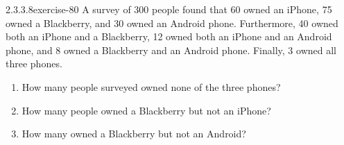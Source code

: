 \documentclass[twoside,10pt,]{book}
\numberwithin{equation}{section}
\begin{document}
\begin{divisionsolution}{2.3.3.8}{}{exercise-80}%
\hypertarget{p-757}{}%
A survey of 300 people found that 60 owned an iPhone, 75 owned a Blackberry, and 30 owned an Android phone. Furthermore, 40 owned both an iPhone and a Blackberry, 12 owned both an iPhone and an Android phone, and 8 owned a Blackberry and an Android phone. Finally, 3 owned all three phones.%
\par
\hypertarget{p-758}{}%
\leavevmode%
\begin{enumerate}[label=(\alph*)]
\item\hypertarget{li-454}{}\hypertarget{p-759}{}%
How many people surveyed owned none of the three phones?%
\item\hypertarget{li-455}{}\hypertarget{p-760}{}%
How many people owned a Blackberry but not an iPhone?%
\item\hypertarget{li-456}{}\hypertarget{p-761}{}%
How many owned a Blackberry but not an Android?%
\end{enumerate}
%
\end{divisionsolution}%
\end{document}
